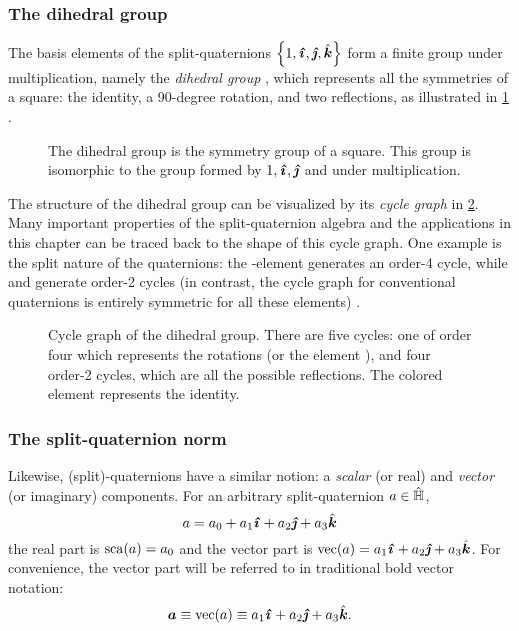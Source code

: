 \subsubsection{The dihedral group} The basis elements of the split-quaternions \(\qty{1, \quati, \quatj, \quatk}\) form a finite group under multiplication, namely the \emph{dihedral group} , which represents all the symmetries of a square: the identity, a 90-degree rotation, and two reflections, as illustrated in \cref{fig:square_symmetry} \cite{Dummit2004}.
\begin{figure}[ht!]
    \centering
    
    \caption{The dihedral group  is the symmetry group of a square. This group is isomorphic to the group formed by \(1, \quati, \quatj\) and \quatk under multiplication.}
    \label{fig:square_symmetry}
\end{figure}

The structure of the dihedral group can be visualized by its \emph{cycle graph} in \cref{fig:cycle_graph}. Many important properties of the split-quaternion algebra and the applications in this chapter can be traced back to the shape of this cycle graph. One example is the split nature of the quaternions: the \quati-element generates an order-4 cycle, while \quatj and \quatk generate order-2 cycles (in contrast, the cycle graph for conventional quaternions is entirely symmetric for all these elements) \cite{Dummit2004}.
\begin{figure}[h!]
    \centering
    
    \caption{Cycle graph of the dihedral group. There are five cycles: one of order four which represents the rotations (or the element \quati), and four order-2 cycles, which are all the possible reflections. The colored element represents the identity.}
    \label{fig:cycle_graph}
\end{figure}

\subsubsection{The split-quaternion norm} Likewise, (split)-quaternions have a similar notion: a \emph{scalar} (or real) and \emph{vector} (or imaginary) components. For an arbitrary split-quaternion \(a \in \hat{\mathbb{H}}\), \cite{Jafari2014}
\begin{equation}
     a = \quat{a_0}{a_1}{a_2}{a_3}
\end{equation}
the real part is \(\mathrm{sca}\qty(a) = a_0\) and the vector part is \( \vecpart{a} = \quatvec{a_1}{a_2}{a_3}\). For convenience, the vector part will be referred to in traditional bold vector notation:
\begin{equation}
     \vec{a} \equiv \vecpart{a} \equiv \quatvec{a_1}{a_2}{a_3}.
\end{equation}

